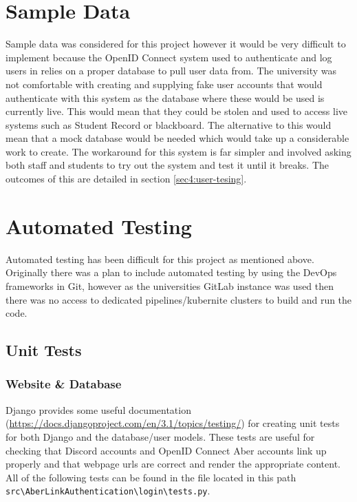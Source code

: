 \section{Sample Data}
Sample data was considered for this project however it would be very difficult to implement because the OpenID Connect \cite{OpenID} system used to authenticate and log users in relies on a proper database to pull user data from. The university was not comfortable with creating and supplying fake user accounts that would authenticate with this system as the database where these would be used is currently live. This would mean that they could be stolen and used to access live systems such as Student Record or blackboard. The alternative to this would mean that a mock database would be needed which would take up a considerable work to create. The workaround for this system is far simpler and involved asking both staff and students to try out the system and test it until it breaks. The outcomes of this are detailed in section \ref{sec4:user-tesing}.

\section{Automated Testing}
Automated testing has been difficult for this project as mentioned above. Originally there was a plan to include automated testing by using the DevOps frameworks in Git, however as the universities GitLab instance was used then there was no access to dedicated pipelines/kubernite clusters to build and run the code.  

\subsection{Unit Tests}

\subsubsection{Website \& Database}\label{sec4:unit-web}
Django provides some useful documentation (\href{https://docs.djangoproject.com/en/3.1/topics/testing/}{https://docs.djangoproject.com/en/3.1/topics/testing/}) for creating unit tests for both Django and the database/user models. These tests are useful for checking that Discord accounts and OpenID Connect \cite{OpenID} Aber accounts link up properly and that webpage urls are correct and render the appropriate content. All of the following tests can be found in the file located in this path \verb|src\AberLinkAuthentication\login\tests.py|. 


